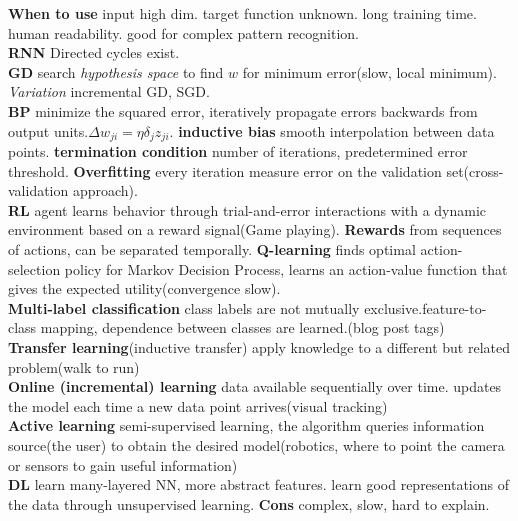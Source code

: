 \documentclass[cheatsheet.tex]{subfiles}
\begin{document}
\textbf{When to use} input high dim. target function unknown. long training time. human readability. good for complex pattern recognition.\\

\textbf{RNN} Directed cycles exist.\\

\textbf{GD} search \textit{hypothesis space} to find $w$ for minimum error(slow, local minimum). \textit{Variation} incremental GD, SGD.\\

\textbf{BP} minimize the squared error, iteratively propagate errors backwards from output units.$\Delta w_{ji}=\eta \delta_jz_{ji}$. \textbf{inductive bias}  smooth interpolation between data points. \textbf{termination condition} number of iterations, predetermined error threshold. \textbf{Overfitting} every iteration measure error on the validation set(cross-validation approach).\\

\textbf{RL} agent learns behavior through trial-and-error interactions with a dynamic environment based on a reward signal(Game playing). \textbf{Rewards} from sequences of actions, can be separated temporally. \textbf{Q-learning} finds optimal action-selection policy for Markov Decision Process, learns an action-value function that gives the expected utility(convergence slow).\\

\textbf{Multi-label classification} class labels are not mutually exclusive.feature-to-class mapping, dependence between classes are learned.(blog post tags)\\

\textbf{Transfer learning}(inductive transfer) apply knowledge to a different but related problem(walk to run)\\

\textbf{Online (incremental) learning} data available sequentially over time. updates the model each time a new data point arrives(visual tracking)\\

\textbf{Active learning} semi-supervised learning, the algorithm queries information source(the user) to obtain the desired model(robotics, where to point the camera or sensors to gain useful information)\\

\textbf{DL} learn many-layered NN, more abstract features. learn good representations of the data through unsupervised learning. \textbf{Cons} complex, slow, hard to explain.
\end{document}
